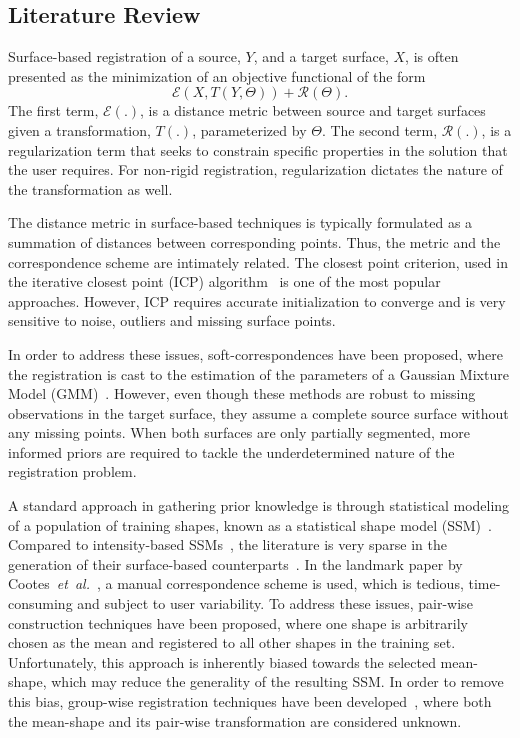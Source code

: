 \documentclass[journal]{IEEEtran}
\begin{document}
\subsection{Literature Review}
Surface-based registration of a source, $Y$, and a target surface, $X$, is often presented as the minimization of an objective functional of the form
\begin{equation} \label{eq:SurfReg}
\mathcal{E}(X,T(Y,\Theta))+\mathcal{R}(\Theta).
\end{equation}
The first term, $\mathcal{E}(.)$, is a distance metric between source and target surfaces given a transformation, $T(.)$, parameterized by $\Theta$. The second term, $\mathcal{R}(.)$, is a regularization term that seeks to constrain specific properties in the solution that the user requires. For non-rigid registration, regularization dictates the nature of the transformation as well.

The distance metric in surface-based techniques is typically formulated as a summation of distances between corresponding points. Thus, the metric and the correspondence scheme are intimately related. The closest point criterion, used in the iterative closest point (ICP) algorithm~\cite{Besl92a,Zhang94a} is one of the most popular approaches. However, ICP requires accurate initialization to converge and is very sensitive to noise, outliers and missing surface points. 

In order to address these issues, soft-correspondences have been proposed, where the registration is cast to the estimation of the parameters of a Gaussian Mixture Model (GMM)~\cite{Chui03a,Wang08a,Jian11a,Myronenko10a,Horaud11a}. However, even though these methods are robust to missing observations in the target surface, they assume a complete source surface without any missing points. When both surfaces are only partially segmented, more informed priors are required to tackle the underdetermined nature of the registration problem. 

A standard approach in gathering prior knowledge is through statistical modeling of a population of training shapes, known as a statistical shape model (SSM)~\cite{Heimann09a}. Compared to intensity-based SSMs~\cite{Avants04a,Balci07a,Bhatia04a,Cootes08a,Joshi04a,Rueckert03a,Twining05a,Wang10a}, the literature is very sparse in the generation of their surface-based counterparts~\cite{Chui04a,Davies02a,Durrleman09a,Rasoulian12b}. In the landmark paper by Cootes~\textit{et~al.}~\cite{Cootes95a}, a manual correspondence scheme is used, which is tedious, time-consuming and subject to user variability. To address these issues, pair-wise construction techniques have been proposed, where one shape is arbitrarily chosen as the mean and registered to all other shapes in the training set. Unfortunately, this approach is inherently biased towards the selected mean-shape, which may reduce the generality of the resulting SSM. In order to remove this bias, group-wise registration techniques have been developed~\cite{Balci07a,Rasoulian12b}, where both the mean-shape and its pair-wise transformation are considered unknown. 
\end{document}
